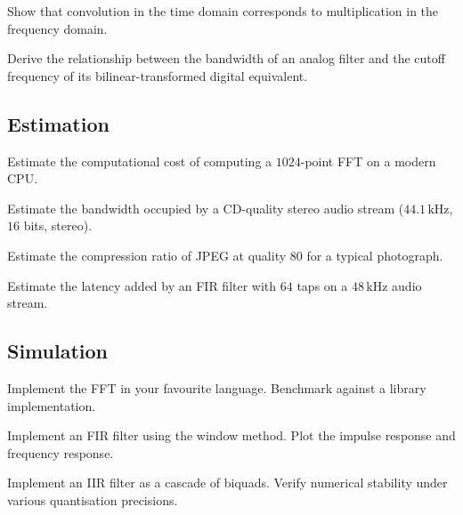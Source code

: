 \begin{exercise}
Show that convolution in the time domain corresponds to multiplication in the frequency domain.
\end{exercise}

\begin{exercise}
Derive the relationship between the bandwidth of an analog filter and the cutoff frequency of its bilinear-transformed digital equivalent.
\end{exercise}

\subsection*{Estimation}

\begin{exercise}
Estimate the computational cost of computing a $1024$-point FFT on a modern CPU.
\end{exercise}

\begin{exercise}
Estimate the bandwidth occupied by a CD-quality stereo audio stream ($44.1\,\si{\kilo\hertz}$, $16$ bits, stereo).
\end{exercise}

\begin{exercise}
Estimate the compression ratio of JPEG at quality $80$ for a typical photograph.
\end{exercise}

\begin{exercise}
Estimate the latency added by an FIR filter with $64$ taps on a $48\,\si{\kilo\hertz}$ audio stream.
\end{exercise}

\subsection*{Simulation}

\begin{exercise}
Implement the FFT in your favourite language. Benchmark against a library implementation.
\end{exercise}

\begin{exercise}
Implement an FIR filter using the window method. Plot the impulse response and frequency response.
\end{exercise}

\begin{exercise}
Implement an IIR filter as a cascade of biquads. Verify numerical stability under various quantisation precisions.
\end{exercise}

